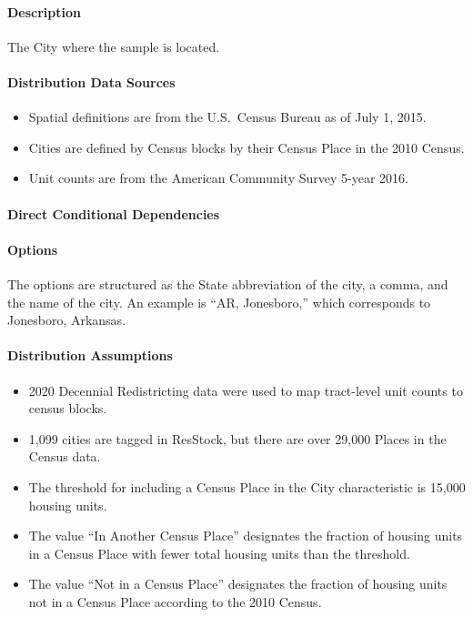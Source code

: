 \paragraph{Description}
% 
The City where the sample is located.

\paragraph{Distribution Data Sources}
% 
\begin{itemize}

\item
  Spatial definitions are from the U.S.~Census Bureau as of July 1,
  2015.
\item
  Cities are defined by Census blocks by their Census Place in the 2010
  Census.
\item
  Unit counts are from the American Community Survey 5-year 2016.
\end{itemize}

\paragraph{Direct Conditional Dependencies}


\paragraph{Options}
The options are structured as the State abbreviation of the city, a comma, and the name of the city. An example is ``AR, Jonesboro,'' which corresponds to Jonesboro, Arkansas.

\paragraph{Distribution Assumptions}
% 
\begin{itemize}
\item
  2020 Decennial Redistricting data were used to map tract-level unit
  counts to census blocks.
\item
  1,099 cities are tagged in ResStock, but there are over 29,000 Places
  in the Census data.
\item
  The threshold for including a Census Place in the City characteristic is 15,000 housing units.
\item
  The value ``In Another Census Place'' designates the fraction of housing units in a Census Place with fewer total housing units than the threshold.
\item
  The value ``Not in a Census Place''
  designates the fraction of housing units not in a Census Place
  according to the 2010 Census.
\end{itemize}
